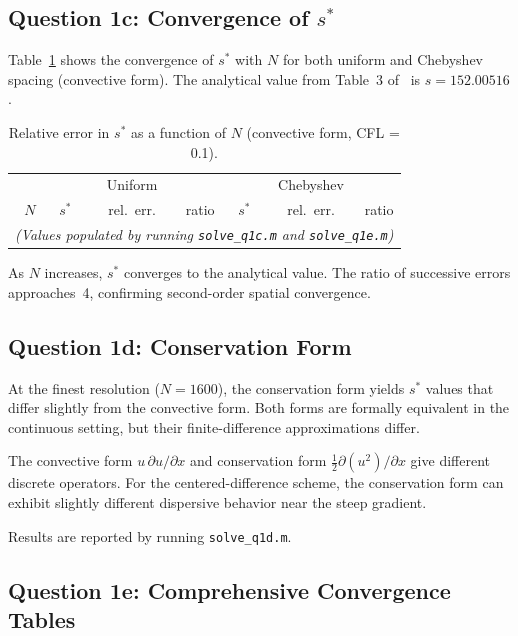 \documentclass[11pt]{article}
\begin{document}
\subsection{Question 1c: Convergence of $s^*$}

Table~\ref{tab:q1c} shows the convergence of $s^*$ with $N$ for both uniform and Chebyshev spacing (convective form). The analytical value from Table~3 of~\cite{basdevant1986} is $s = 152.00516$.

\begin{table}[H]
\centering
\caption{Relative error in $s^*$ as a function of $N$ (convective form, CFL = 0.1).}
\label{tab:q1c}
\begin{tabular}{@{}rrrr|rrr@{}}
\toprule
& \multicolumn{3}{c|}{Uniform} & \multicolumn{3}{c}{Chebyshev} \\
$N$ & $s^*$ & rel.~err. & ratio & $s^*$ & rel.~err. & ratio \\
\midrule
\multicolumn{7}{c}{\emph{(Values populated by running \texttt{solve\_q1c.m} and \texttt{solve\_q1e.m})}} \\
\bottomrule
\end{tabular}
\end{table}

As $N$ increases, $s^*$ converges to the analytical value. The ratio of successive errors approaches~4, confirming second-order spatial convergence.

\subsection{Question 1d: Conservation Form}

At the finest resolution ($N = 1600$), the conservation form yields $s^*$ values that differ slightly from the convective form. Both forms are formally equivalent in the continuous setting, but their finite-difference approximations differ.

The convective form $u\, \partial u/\partial x$ and conservation form $\frac{1}{2}\partial(u^2)/\partial x$ give different discrete operators. For the centered-difference scheme, the conservation form can exhibit slightly different dispersive behavior near the steep gradient.

Results are reported by running \texttt{solve\_q1d.m}.

\subsection{Question 1e: Comprehensive Convergence Tables}
\end{document}
